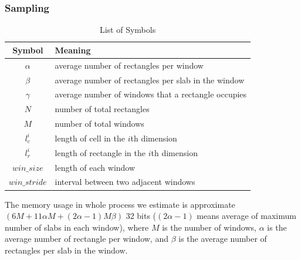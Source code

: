 \subsubsection{Sampling}
\begin{table}[h!]
\centering
\begin{tabular}{|c | l |} 
 \hline
 Symbol & Meaning \\ [0.5ex] 
 \hline
 $\alpha$ & average number of rectangles per window  \\
 $\beta$ & average number of rectangles per slab in the window  \\
 $\gamma$ & average number of windows that a rectangle occupies  \\
 $N$ & number of total rectangles \\
 $M$ & number of total windows  \\ \hline
 $l^i_c$ & length of cell in the $i$th dimension  \\
 $l^i_r$ & length of rectangle in the $i$th dimension  \\ \hline
 $win\_size$ & length of each window  \\
 $win\_stride$ & interval between two adjacent windows  \\
 \hline
\end{tabular}
\caption{List of Symbols}
\label{table:symbol}
\end{table}
The memory usage in whole process we estimate is approximate $(6M + 11\alpha M + (2\alpha - 1) M\beta)$ 32 bits ($(2\alpha - 1)$ means average of maximum number of slabs in each window), where $M$ is the number of windows, $\alpha$ is the average number of rectangle per window, and $\beta$ is the average number of rectangles per slab in the window.

